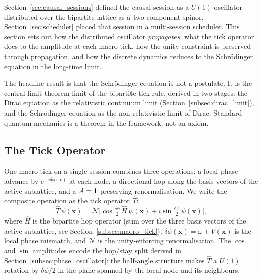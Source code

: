 
\label{sec:phase}

Section~\ref{sec:causal_sessions} defined the causal session as a
$U(1)$ oscillator distributed over the bipartite lattice as a
two-component spinor.
Section~\ref{sec:scheduler} placed that session in a multi-session
scheduler.
This section sets out how the distributed oscillator
\emph{propagates}: what the tick operator does to the amplitude at
each macro-tick, how the unity constraint is preserved through
propagation, and how the discrete dynamics reduces to the
Schr\"odinger equation in the long-time limit.

The headline result is that the Schr\"odinger equation is not a
postulate. It is the central-limit-theorem limit of the bipartite
tick rule, derived in two stages: the Dirac equation as the
relativistic continuum limit
(Section~\ref{subsec:dirac_limit}), and the Schr\"odinger equation as
the non-relativistic limit of Dirac. Standard quantum mechanics is a
theorem in the framework, not an axiom.

\subsection{The Tick Operator}
\label{subsec:tick_operator}

One macro-tick on a single session combines three operations: a local
phase advance by $e^{-i\delta\phi(\mathbf{x})}$ at each node, a
directional hop along the basis vectors of the active sublattice, and
a $\mathcal{A}=1$-preserving renormalisation. We write the composite
operation as the tick operator $\hat{T}$:
\begin{equation}
    \hat{T}\,\psi(\mathbf{x}) =
        \mathcal{N}\bigl[
            \cos\!\tfrac{\delta\phi}{2}\,\hat{H}\,\psi(\mathbf{x})
          + i\sin\!\tfrac{\delta\phi}{2}\,\psi(\mathbf{x})
        \bigr],
    \label{eq:tick_operator}
\end{equation}
where $\hat{H}$ is the bipartite hop operator (sum over the three
basis vectors of the active sublattice, see
Section~\ref{subsec:macro_tick}), $\delta\phi(\mathbf{x}) = \omega +
V(\mathbf{x})$ is the local phase mismatch, and $\mathcal{N}$ is the
unity-enforcing renormalisation. The $\cos$ and $\sin$ amplitudes
encode the hop/stay split derived in
Section~\ref{subsec:phase_oscillator}: the half-angle structure makes
$\hat{T}$ a $U(1)$ rotation by $\delta\phi/2$ in the plane spanned by
the local node and its neighbours.

